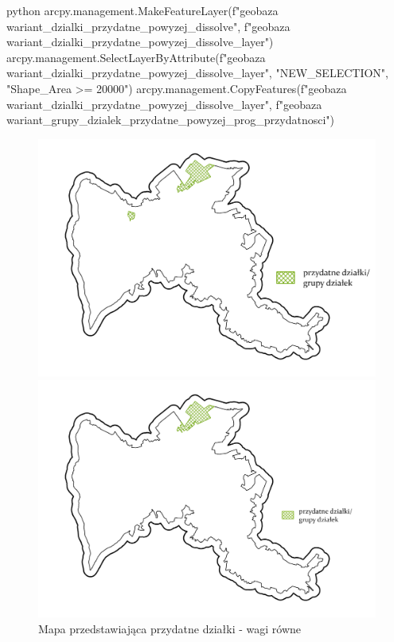 \documentclass{article}
\begin{document}
\begin{mintedbox}{python}
arcpy.management.MakeFeatureLayer(f"{geobaza}\\{wariant}_dzialki_przydatne_powyzej_dissolve", f"{geobaza}\\{wariant}_dzialki_przydatne_powyzej_dissolve_layer")
arcpy.management.SelectLayerByAttribute(f"{geobaza}\\{wariant}_dzialki_przydatne_powyzej_dissolve_layer", "NEW_SELECTION", "Shape_Area >= 20000")
arcpy.management.CopyFeatures(f"{geobaza}\\{wariant}_dzialki_przydatne_powyzej_dissolve_layer", f"{geobaza}\\{wariant}_grupy_dzialek_przydatne_powyzej_{prog_przydatnosci}")
\end{mintedbox}

\begin{figure}[H]
    \begin{minipage}[t]{0.48\textwidth}
        \centering
        \includegraphics[width=\linewidth]{img/przydatne-dzialki.jpg}
        \caption{Mapa przedstawiająca przydatne działki - wagi równe}
        \label{fig:przydatne-dzialki-rowne}
    \end{minipage}
    \hfill
    \begin{minipage}[t]{0.48\textwidth}
        \centering
        \includegraphics[width=\linewidth]{img/roznewagi-przydatne-dzialki.jpg}

\end{minipage}
\end{figure}
\end{document}
